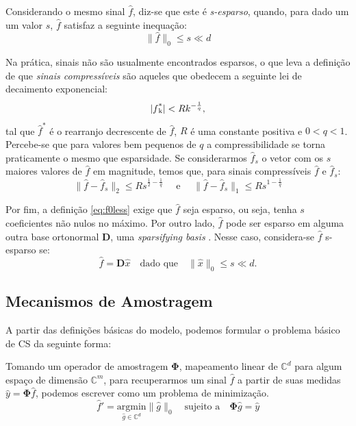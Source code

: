 \documentclass[cic,tc]{iiufrgs}
\def\SPSB#1#2{\rlap{\textsuperscript{#1}}\SB{#2}}
\def\SB#1{\textsubscript{#1}}
\begin{document}
Considerando o mesmo sinal $\hat{f}$, diz-se que este é \textit{s-esparso}, quando, para dado um um valor $s$, $\hat{f}$
satisfaz a seguinte inequação:
\begin{equation}
    \label{eq:f0less}
    \lVert \hat{f} \rVert_0 \le s \ll d
\end{equation} 

Na prática, sinais não são usualmente encontrados esparsos, o que leva a definição de que \textit{sinais compressíveis}
são aqueles que obedecem a seguinte lei de decaimento exponencial:
\begin{equation}
    | f\SPSB{*}{k} | < R k^{-\frac{1}{q}},  
\end{equation}
tal que $\hat{f}^* $ é o rearranjo decrescente de $\hat{f}$, $R$ é uma constante positiva e $0< q < 1$. Percebe-se
que para valores bem pequenos de $q$ a compressibilidade se torna praticamente o mesmo que esparsidade. Se considerarmos
$\hat{f}_s$ o vetor com os $s$ maiores valores de $\hat{f}$ em magnitude, temos que, para sinais compressíveis $\hat{f}$ e 
$\hat{f}_s$:
\begin{equation}
    \lVert \hat{f} - \hat{f}_s \rVert_2 \le Rs^{\frac{1}{2} - \frac{1}{q}} \hspace{1em} \text{ e } \hspace{1em}
    \lVert \hat{f} - \hat{f}_s \rVert_1 \le Rs^{1 - \frac{1}{q}} 
\end{equation} 

Por fim, a definição \eqref{eq:f0less} exige que $\hat{f}$ seja esparso, ou seja, tenha $s$ coeficientes não nulos
no máximo. Por outro lado, $\hat{f}$ pode ser esparso em alguma outra base ortonormal $\mathbf{D}$, uma \textit{sparsifying basis} 
\cite{CandesDecoLinear}. Nesse caso, considera-se $\hat{f}$ s-esparso se:
\begin{equation}
    \hat{f} = \mathbf{D}\hat{x} \hspace{1em} \text{dado que} \hspace{1em} \lVert \hat{x} \rVert_0 \le s \ll d.
\end{equation}


\subsection{Mecanismos de Amostragem}
A partir das definições básicas do modelo, podemos formular o problema básico de CS da seguinte forma:

Tomando um operador de amostragem $\mathbf{\Phi}$, mapeamento linear de $\mathbb{C}^d$ para algum espaço de dimensão 
$\mathbb{C}^m$, para recuperarmos um sinal $\hat{f}$ a partir de suas medidas $\hat{y} = \mathbf{\Phi} \hat{f}$, podemos escrever
como um problema de minimização.
\begin{equation}
    \label{eq:problem}
    \hat{f}' = \underset{\hat{g} \in \mathbb{C}^d}{\text{argmin}} \lVert \hat{g} \rVert_0 \hspace{1em} \text{sujeito a} \hspace{1em}
    \mathbf{\Phi} \hat{g} = \hat{y} 
\end{equation}
\end{document}
